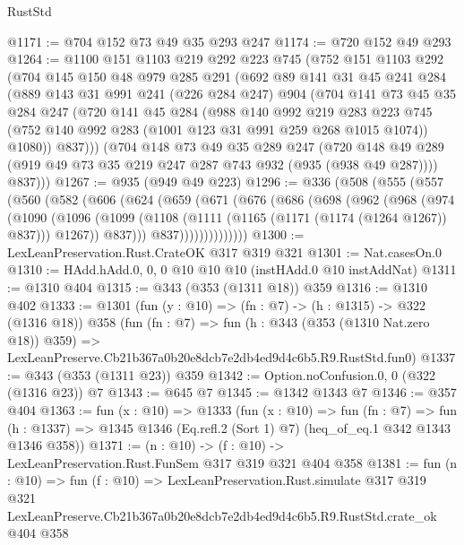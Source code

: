 \begin{lexlean}{RustStd}
\begin{coremodule}
@1171 := @704 @152 @73 @49 @35 @293 @247
@1174 := @720 @152 @49 @293
@1264 := @1100
    @151
    @1103
    @219
    @292
    @223
    @745
    (@752
      @151
      @1103
      @292
      (@704
        @145
        @150
        @48
        @979
        @285
        @291
        (@692
          @89
          @141
          @31
          @45
          @241
          @284
          (@889
            @143
            @31
            @991
            @241
            (@226 @284 @247)
            @904
            (@704
              @141
              @73
              @45
              @35
              @284
              @247
              (@720
                @141
                @45
                @284
                (@988
                  @140
                  @992
                  @219
                  @283
                  @223
                  @745
                  (@752 @140 @992 @283 (@1001 @123 @31 @991 @259 @268 @1015 @1074))
                  @1080))
              @837)))
        (@704
          @148
          @73
          @49
          @35
          @289
          @247
          (@720 @148 @49 @289 (@919 @49 @73 @35 @219 @247 @287 @743 @932 (@935 (@938 @49 @287))))
          @837)))
@1267 := @935 (@949 @49 @223)
@1296 := @336
    (@508
      (@555
        (@557
          (@560
            (@582
              (@606
                (@624
                  (@659
                    (@671
                      (@676
                        (@686
                          (@698
                            (@962
                              (@968
                                (@974
                                  (@1090
                                    (@1096
                                      (@1099
                                        (@1108
                                          (@1111 (@1165 (@1171 (@1174 (@1264 @1267)) @837)))
                                          @1267))
                                      @837)))
                                @837))))))))))))))
@1300 := LexLeanPreservation.Rust.CrateOK @317 @319 @321
@1301 := Nat.casesOn.{0}
@1310 := HAdd.hAdd.{0, 0, 0} @10 @10 @10 (instHAdd.{0} @10 instAddNat)
@1311 := @1310 @404
@1315 := @343 (@353 (@1311 @18)) @359
@1316 := @1310 @402
@1333 := @1301
    (fun (y : @10) => (fn : @7) -> (h : @1315) -> @322 (@1316 @18))
    @358
    (fun (fn : @7) =>
    fun (h : @343 (@353 (@1310 Nat.zero @18)) @359) =>
    LexLeanPreserve.Cb21b367a0b20e8dcb7e2db4ed9d4c6b5.R9.RustStd.fun0)
@1337 := @343 (@353 (@1311 @23)) @359
@1342 := Option.noConfusion.{0, 0} (@322 (@1316 @23)) @7
@1343 := @645 @7
@1345 := @1342 @1343 @7
@1346 := @357 @404
@1363 := fun (x : @10) =>
  @1333
    (fun (x : @10) =>
    fun (fn : @7) =>
    fun (h : @1337) => @1345 @1346 (Eq.refl.{2} (Sort 1) @7) (heq_of_eq.{1} @342 @1343 @1346 @358))
@1371 := (n : @10) -> (f : @10) -> LexLeanPreservation.Rust.FunSem @317 @319 @321 @404 @358
@1381 := fun (n : @10) =>
  fun (f : @10) =>
  LexLeanPreservation.Rust.simulate
    @317
    @319
    @321
    LexLeanPreserve.Cb21b367a0b20e8dcb7e2db4ed9d4c6b5.R9.RustStd.crate_ok
    @404
    @358
\end{coremodule}
\end{lexlean}
